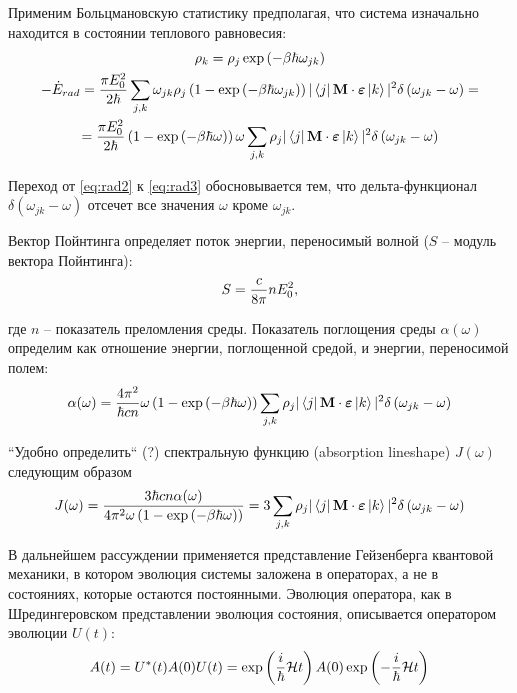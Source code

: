 \documentclass[12pt]{article}
\newcommand{\lb}{\left(}
\newcommand{\rb}{\right)}
\newcommand{\mH}{\mathcal{H}}
\newcommand{\mf}{\mathbf}
\newcommand{\vverh}{\vspace*{-0.15cm}}
\begin{document}
Применим Больцмановскую статистику предполагая, что система изначально находится в состоянии теплового равновесия:
\vverh
\begin{gather}
	\rho_k = \rho_j \exp \lb - \beta \hbar \omega_{jk} \rb \notag \\
	- \dot{E}_{rad} = \frac{\pi E_0^2}{2 \hbar} \sum_{j, k} \omega_{jk} \rho_j \lb 1 - \exp \lb - \beta \hbar \omega_{jk} \rb \rb | \bra{j} \mf{M} \cdot \boldsymbol{\varepsilon} \ket{k} |^2 \delta \lb \omega_{jk} - \omega \rb = \label{eq:rad2} \\
	= \frac{\pi E_0^2}{2 \hbar} \lb 1 - \exp \lb - \beta \hbar \omega \rb \rb \omega \sum_{j, k} \rho_j | \bra{j} \mf{M} \cdot \boldsymbol{\varepsilon} \ket{k} |^2 \delta \lb \omega_{jk} - \omega \rb \label{eq:rad3} 
\end{gather}

Переход от \eqref{eq:rad2} к \eqref{eq:rad3} обосновывается тем, что дельта-функционал $\delta \lb \omega_{jk} - \omega \rb$ отсечет все значения $\omega$ кроме $\omega_{jk}$.  

Вектор Пойнтинга определяет поток энергии, переносимый волной ($S$ -- модуль вектора Пойнтинга):
\vverh
\begin{gather}
	S = \frac{c}{8 \pi} n E_0^2, \notag
\end{gather}

где $n$ -- показатель преломления среды. Показатель поглощения среды $\alpha(\omega)$ определим как отношение энергии, поглощенной средой, и энергии, переносимой полем:
\vverh
\begin{gather}
	\alpha(\omega) = \frac{4 \pi^2}{\hbar c n} \omega \lb 1 - \exp \lb - \beta \hbar \omega \rb \rb \sum_{j, k} \rho_j | \bra{j} \mf{M} \cdot \boldsymbol{\varepsilon} \ket{k} |^2 \delta \lb \omega_{jk} - \omega \rb \notag
\end{gather}

``Удобно определить`` (?) спектральную функцию (absorption lineshape) $J(\omega)$ следующим образом  
\vverh
\begin{gather}
	J(\omega) = \frac{3 \hbar c n \alpha(\omega)}{4 \pi^2 \omega \lb 1 - \exp \lb - \beta \hbar \omega \rb \rb} = 3 \sum_{j, k} \rho_j | \bra{j} \mf{M} \cdot \boldsymbol{\varepsilon} \ket{k} |^2 \delta \lb \omega_{jk} - \omega \rb \label{eq:specfunc} 
\end{gather}

В дальнейшем рассуждении применяется представление Гейзенберга квантовой механики, в котором эволюция системы заложена в операторах, а не в состояниях, которые остаются постоянными. Эволюция оператора, как в Шредингеровском представлении эволюция состояния, описывается оператором эволюции $U(t)$:
\vverh
\begin{gather}
	A(t) = U^{*}(t) A(0) U(t) = \exp \lb \frac{i}{\hbar} \mH t \rb A(0) \exp \lb - \frac{i}{\hbar} \mH t \rb \notag
\end{gather}
\end{document}

